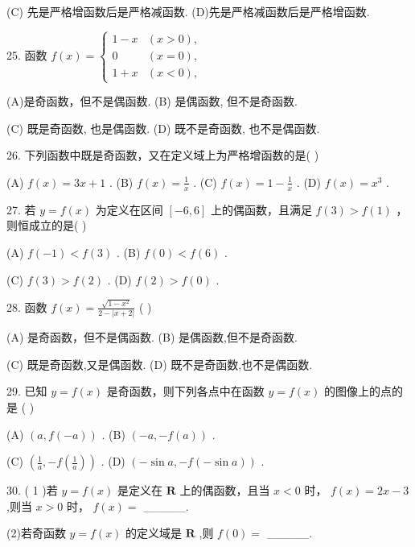 \documentclass[10pt]{article}
\begin{document}
(C) 先是严格增函数后是严格减函数. (D)先是严格减函数后是严格增函数.

25. 函数 \(f\left( x\right)  = \left\{  \begin{array}{ll} 1 - x & \left( {x > 0}\right) , \\  0 & \left( {x = 0}\right) , \\  1 + x & \left( {x < 0}\right) , \end{array}\right.\)

(A)是奇函数，但不是偶函数. (B) 是偶函数, 但不是奇函数.

(C) 既是奇函数, 也是偶函数. (D) 既不是奇函数, 也不是偶函数.

26. 下列函数中既是奇函数，又在定义域上为严格增函数的是( )

(A) \(f\left( x\right)  = {3x} + 1\) . (B) \(f\left( x\right)  = \frac{1}{x}\) . (C) \(f\left( x\right)  = 1 - \frac{1}{x}\) . (D) \(f\left( x\right)  = {x}^{3}\) .

27. 若 \(y = f\left( x\right)\) 为定义在区间 \(\left\lbrack  {-6,6}\right\rbrack\) 上的偶函数，且满足 \(f\left( 3\right)  > f\left( 1\right)\) ，则恒成立的是( )

(A) \(f\left( {-1}\right)  < f\left( 3\right)\) . (B) \(f\left( 0\right)  < f\left( 6\right)\) .

(C) \(f\left( 3\right)  > f\left( 2\right)\) . (D) \(f\left( 2\right)  > f\left( 0\right)\) .

28. 函数 \(f\left( x\right)  = \frac{\sqrt{1 - {x}^{2}}}{2 - \left| {x + 2}\right| }\) (   )

(A) 是奇函数，但不是偶函数. (B) 是偶函数,但不是奇函数.

(C) 既是奇函数,又是偶函数. (D) 既不是奇函数,也不是偶函数.

29. 已知 \(y = f\left( x\right)\) 是奇函数，则下列各点中在函数 \(y = f\left( x\right)\) 的图像上的点的是 ( )

(A) \(\left( {a,f\left( {-a}\right) }\right)\) . (B) \(\left( {-a, - f\left( a\right) }\right)\) .

(C) \(\left( {\frac{1}{a}, - f\left( \frac{1}{a}\right) }\right)\) . (D) \(\left( {-\sin a, - f\left( {-\sin a}\right) }\right)\) .

30. ( 1 )若 \(y = f\left( x\right)\) 是定义在 \(\mathbf{R}\) 上的偶函数，且当 \(x < 0\) 时， \(f\left( x\right)  = {2x} - 3\) ,则当 \(x > 0\) 时， \(f\left( x\right)  =\) \_\_\_\_\_.

(2)若奇函数 \(y = f\left( x\right)\) 的定义域是 \(\mathbf{R}\) ,则 \(f\left( 0\right)  =\) \_\_\_\_\_.
\end{document}
